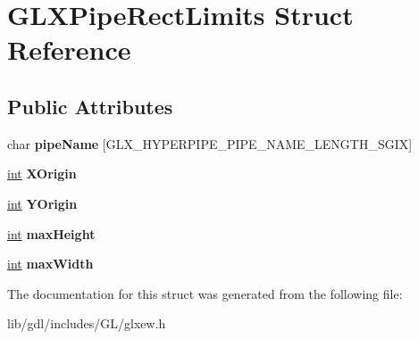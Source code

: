 \hypertarget{struct_g_l_x_pipe_rect_limits}{}\section{G\+L\+X\+Pipe\+Rect\+Limits Struct Reference}
\label{struct_g_l_x_pipe_rect_limits}
\subsection*{Public Attributes}
\begin{DoxyCompactItemize}
\item 
\hypertarget{struct_g_l_x_pipe_rect_limits_ae78b4b6656101bc841946733a5b6e5ce}{}char {\bfseries pipe\+Name} \mbox{[}G\+L\+X\+\_\+\+H\+Y\+P\+E\+R\+P\+I\+P\+E\+\_\+\+P\+I\+P\+E\+\_\+\+N\+A\+M\+E\+\_\+\+L\+E\+N\+G\+T\+H\+\_\+\+S\+G\+I\+X\mbox{]}\label{struct_g_l_x_pipe_rect_limits_ae78b4b6656101bc841946733a5b6e5ce}

\item 
\hypertarget{struct_g_l_x_pipe_rect_limits_a3e5a965059d9f5d2ca42acd35af5bb9b}{}\hyperlink{_s_d_l__thread_8h_a6a64f9be4433e4de6e2f2f548cf3c08e}{int} {\bfseries X\+Origin}\label{struct_g_l_x_pipe_rect_limits_a3e5a965059d9f5d2ca42acd35af5bb9b}

\item 
\hypertarget{struct_g_l_x_pipe_rect_limits_a50e06bcf0dae95854be7d93a515199e9}{}\hyperlink{_s_d_l__thread_8h_a6a64f9be4433e4de6e2f2f548cf3c08e}{int} {\bfseries Y\+Origin}\label{struct_g_l_x_pipe_rect_limits_a50e06bcf0dae95854be7d93a515199e9}

\item 
\hypertarget{struct_g_l_x_pipe_rect_limits_a27572e499c0d3280031c2ad8e387c0c1}{}\hyperlink{_s_d_l__thread_8h_a6a64f9be4433e4de6e2f2f548cf3c08e}{int} {\bfseries max\+Height}\label{struct_g_l_x_pipe_rect_limits_a27572e499c0d3280031c2ad8e387c0c1}

\item 
\hypertarget{struct_g_l_x_pipe_rect_limits_a8662c7a712b30620e25fc994adf337a1}{}\hyperlink{_s_d_l__thread_8h_a6a64f9be4433e4de6e2f2f548cf3c08e}{int} {\bfseries max\+Width}\label{struct_g_l_x_pipe_rect_limits_a8662c7a712b30620e25fc994adf337a1}

\end{DoxyCompactItemize}


The documentation for this struct was generated from the following file\+:\begin{DoxyCompactItemize}
\item 
lib/gdl/includes/\+G\+L/glxew.\+h\end{DoxyCompactItemize}
